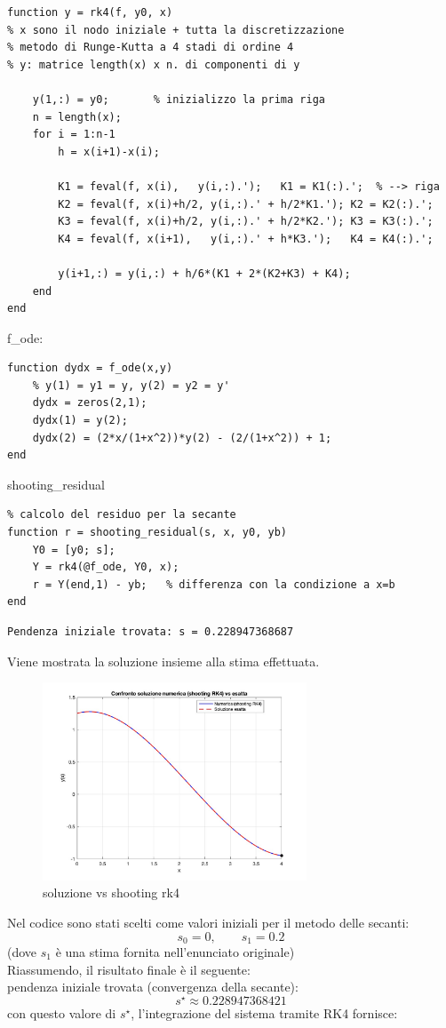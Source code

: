 \documentclass[11pt]{article}
\begin{document}
\begin{lstlisting}
function y = rk4(f, y0, x)
% x sono il nodo iniziale + tutta la discretizzazione
% metodo di Runge-Kutta a 4 stadi di ordine 4
% y: matrice length(x) x n. di componenti di y

    y(1,:) = y0;       % inizializzo la prima riga
    n = length(x);
    for i = 1:n-1
        h = x(i+1)-x(i);

        K1 = feval(f, x(i),   y(i,:).');   K1 = K1(:).';  % --> riga
        K2 = feval(f, x(i)+h/2, y(i,:).' + h/2*K1.'); K2 = K2(:).';
        K3 = feval(f, x(i)+h/2, y(i,:).' + h/2*K2.'); K3 = K3(:).';
        K4 = feval(f, x(i+1),   y(i,:).' + h*K3.');   K4 = K4(:).';

        y(i+1,:) = y(i,:) + h/6*(K1 + 2*(K2+K3) + K4);
    end
end
\end{lstlisting}
f\_ode:
\begin{lstlisting}
function dydx = f_ode(x,y)
    % y(1) = y1 = y, y(2) = y2 = y'
    dydx = zeros(2,1);
    dydx(1) = y(2);
    dydx(2) = (2*x/(1+x^2))*y(2) - (2/(1+x^2)) + 1;
end
\end{lstlisting}
shooting\_residual
\begin{lstlisting}
% calcolo del residuo per la secante
function r = shooting_residual(s, x, y0, yb)
    Y0 = [y0; s];
    Y = rk4(@f_ode, Y0, x);
    r = Y(end,1) - yb;   % differenza con la condizione a x=b
end
\end{lstlisting}
\begin{lstlisting}[style=console]
	Pendenza iniziale trovata: s = 0.228947368687
\end{lstlisting}
Viene mostrata la soluzione insieme alla stima effettuata.
\begin{figure}[H]
  \centering
  \includegraphics[width=0.7\textwidth]{images/fig6.jpg} 
  \caption{soluzione vs shooting rk4}
  \label{fig:funzione}
\end{figure}
Nel codice sono stati scelti come valori iniziali per il metodo delle secanti:
\[
s_0 = 0, \qquad s_1 = 0.2 
\]
(dove \( s_1 \) è una stima fornita nell'enunciato originale)\\
Riassumendo, il risultato finale è il seguente:\\
pendenza iniziale trovata (convergenza della secante):
\[
s^\star \approx 0.228947368421
\]
con questo valore di \( s^\star \), l'integrazione del sistema tramite RK4 fornisce:
\end{document}
